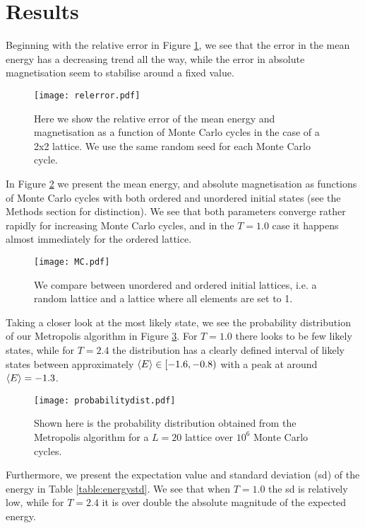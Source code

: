 \section{Results}
\label{sec:results}

Beginning with the relative error in Figure \ref{fig:compare}, we see that the error in the mean energy has a decreasing trend all the way, while the error in absolute magnetisation seem to stabilise around a fixed value.
\begin{figure}[htbp]
	\centering
	\texttt{[image: relerror.pdf]}
	\caption{Here we show the relative error of the mean energy and magnetisation as a function of Monte Carlo cycles in the case of a 2x2 lattice. We use the same random seed for each Monte Carlo cycle.}
	\label{fig:compare}
\end{figure}

In Figure \ref{fig:MC} we present the mean energy, and absolute magnetisation as functions of Monte Carlo cycles with both ordered and unordered initial states (see the Methods section for distinction). We see that both parameters converge rather rapidly for increasing Monte Carlo cycles, and in the $T=1.0$ case it happens almost immediately for the ordered lattice.
\begin{figure}[htbp]
	\centering
	\texttt{[image: MC.pdf]}
	\caption{We compare between unordered and ordered initial lattices, i.e. a random lattice and a lattice where all elements are set to 1.}
	\label{fig:MC}
\end{figure}

Taking a closer look at the most likely state, we see the probability distribution of our Metropolis algorithm in Figure \ref{fig:probabilitydist}. For $T=1.0$ there looks to be few likely states, while for $T=2.4$ the distribution has a clearly defined interval of likely states between approximately $\expval{E} \in [-1.6, -0.8)$ with a peak at around $\expval{E} = -1.3$.
\begin{figure}[htbp]
	\centering
	\texttt{[image: probabilitydist.pdf]}
	\caption{Shown here is the probability distribution obtained from the Metropolis algorithm for a $L=20$ lattice over $10^6$ Monte Carlo cycles.}
	\label{fig:probabilitydist}
\end{figure}

Furthermore, we present the expectation value and standard deviation (sd) of the energy in Table \ref{table:energystd}. We see that when $T=1.0$ the sd is relatively low, while for $T=2.4$ it is over double the absolute magnitude of the expected energy.

